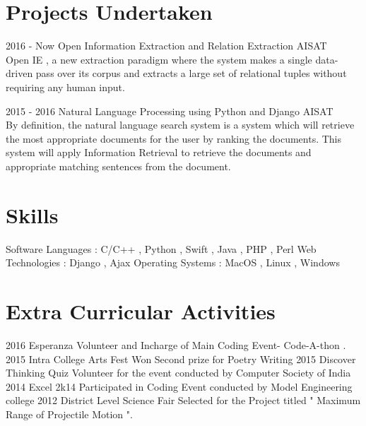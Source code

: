 \documentclass[]{cv-style} %
\begin{document}
\section{Projects Undertaken}
\begin{entrylist}
\entry
  {2016 - Now}
  {Open Information Extraction and Relation Extraction}
  {AISAT}
  {\\
Open  IE ,  a  new  extraction paradigm where the system makes a single data-driven pass over its corpus and extracts a large set of relational tuples without requiring any human input.}

\entry
  {2015 - 2016}
  {Natural Language Processing using Python and Django}
  {AISAT}
  {\\
By definition, the natural language search system is a system which will retrieve the most appropriate documents for the user by ranking the documents. This system will apply Information Retrieval to retrieve the documents and appropriate matching sentences from the document.}

\end{entrylist}
\section{Skills}
\begin{entrylist}
\entry
{Software Languages : }
{     C/C++ , Python , Swift , Java , PHP , Perl}
{}
{}
\entry
{Web Technologies : }
{     Django , Ajax}
{}
{}
\entry
{Operating Systems :}
{     MacOS , Linux , Windows}
{}
{}
\end{entrylist}
\section{Extra Curricular Activities}
\begin{entrylist}
\entry
{2016}
{Esperanza}
{}
{Volunteer and Incharge of Main Coding Event- Code-A-thon .}
\entry
{2015}
{Intra College Arts Fest}
{}
{Won Second prize for Poetry Writing}
\entry
{2015}
{Discover Thinking Quiz}
{}
{Volunteer for the event conducted by Computer Society of India}
\entry
{2014}
{Excel 2k14}
{}
{Participated in Coding Event conducted by Model Engineering college}
\entry
{2012}
{District Level Science Fair}
{}
{Selected for the Project titled " Maximum Range of Projectile Motion ".}
\end{entrylist}
\end{document}
